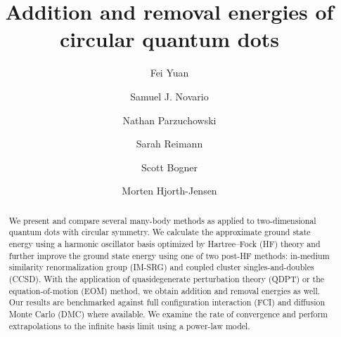 
\usepackage{amsmath}
\usepackage{amssymb}
\usepackage{bm}
\usepackage{booktabs}
\usepackage{color}
\usepackage{graphicx}
\usepackage{hyperref}
\usepackage{natbib}
\usepackage{siunitx}
\usepackage{subcaption}

\newcommand{\D}{\operatorname{d\!}}
\newcommand{\E}{\operatorname{e}}
\newcommand{\bra}[1]{\langle #1 |}
\newcommand{\braket}[2]{\langle #1 | #2\rangle}
\newcommand{\ket}[1]{| #1 \rangle}
\newcommand{\normord}[1]{\mathopen: #1 \mathclose:}
\newcommand{\overbar}[1]{\mkern 3.0mu\overline{\mkern-3.0mu #1 \mkern-0.8mu}\mkern 0.8mu}


\title{Addition and removal energies of circular quantum dots}

\author{Fei Yuan}
\author{Samuel J. Novario}
\author{Nathan Parzuchowski}
\author{Sarah Reimann}
\author{Scott Bogner}
\author{Morten Hjorth-Jensen}

\begin{abstract}
  We present and compare several many-body methods as applied to two-dimensional quantum dots with circular symmetry.  We calculate the approximate ground state energy using a harmonic oscillator basis optimized by Hartree--Fock (HF) theory and further improve the ground state energy using one of two post-HF methods: in-medium similarity renormalization group (IM-SRG) and coupled cluster singles-and-doubles (CCSD).  With the application of quasidegenerate perturbation theory (QDPT) or the equation-of-motion (EOM) method, we obtain addition and removal energies as well.  Our results are benchmarked against full configuration interaction (FCI) and diffusion Monte Carlo (DMC) where available.  We examine the rate of convergence and perform extrapolations to the infinite basis limit using a power-law model.
\end{abstract}

